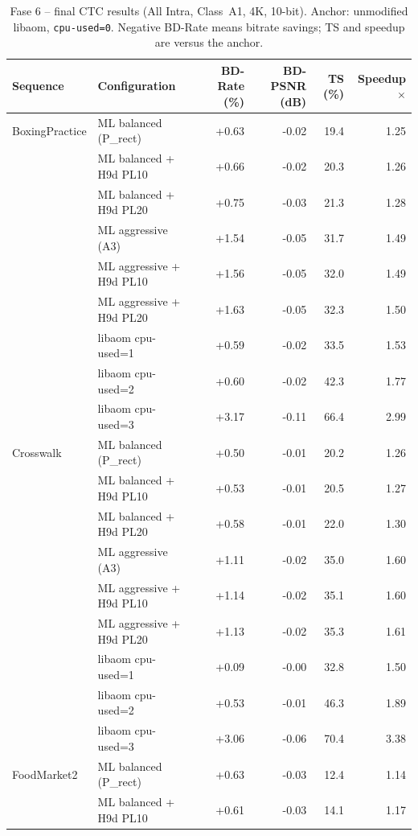 \begin{table}[t]
\centering
\caption{Fase 6 -- final CTC results (All Intra, Class~A1, 4K, 10-bit). Anchor: unmodified libaom, \texttt{cpu-used=0}. Negative BD-Rate means bitrate savings; TS and speedup are versus the anchor.}
\label{tab:fase6-ctc}
\begin{tabular}{llrrrr}
\toprule
Sequence & Configuration & BD-Rate (\%) & BD-PSNR (dB) & TS (\%) & Speedup$\times$ \\
\midrule
BoxingPractice & ML balanced (P\_rect) & +0.63 & -0.02 & 19.4 & 1.25 \\
 & ML balanced + H9d PL10 & +0.66 & -0.02 & 20.3 & 1.26 \\
 & ML balanced + H9d PL20 & +0.75 & -0.03 & 21.3 & 1.28 \\
 & ML aggressive (A3) & +1.54 & -0.05 & 31.7 & 1.49 \\
 & ML aggressive + H9d PL10 & +1.56 & -0.05 & 32.0 & 1.49 \\
 & ML aggressive + H9d PL20 & +1.63 & -0.05 & 32.3 & 1.50 \\
 & libaom cpu-used=1 & +0.59 & -0.02 & 33.5 & 1.53 \\
 & libaom cpu-used=2 & +0.60 & -0.02 & 42.3 & 1.77 \\
 & libaom cpu-used=3 & +3.17 & -0.11 & 66.4 & 2.99 \\
\midrule
Crosswalk & ML balanced (P\_rect) & +0.50 & -0.01 & 20.2 & 1.26 \\
 & ML balanced + H9d PL10 & +0.53 & -0.01 & 20.5 & 1.27 \\
 & ML balanced + H9d PL20 & +0.58 & -0.01 & 22.0 & 1.30 \\
 & ML aggressive (A3) & +1.11 & -0.02 & 35.0 & 1.60 \\
 & ML aggressive + H9d PL10 & +1.14 & -0.02 & 35.1 & 1.60 \\
 & ML aggressive + H9d PL20 & +1.13 & -0.02 & 35.3 & 1.61 \\
 & libaom cpu-used=1 & +0.09 & -0.00 & 32.8 & 1.50 \\
 & libaom cpu-used=2 & +0.53 & -0.01 & 46.3 & 1.89 \\
 & libaom cpu-used=3 & +3.06 & -0.06 & 70.4 & 3.38 \\
\midrule
FoodMarket2 & ML balanced (P\_rect) & +0.63 & -0.03 & 12.4 & 1.14 \\
 & ML balanced + H9d PL10 & +0.61 & -0.03 & 14.1 & 1.17 \\

\end{tabular}
\end{table}

